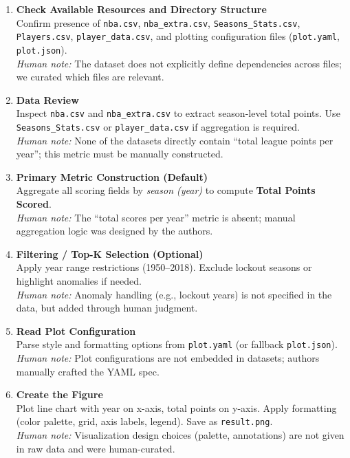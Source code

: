 \documentclass[11pt, a4paper, logo, copyright]{googlecloud}
\begin{document}
\begin{enumerate}[itemsep=0pt, parsep=0pt, topsep=0pt, leftmargin=2em]
    \item \textbf{Check Available Resources and Directory Structure} \\
    Confirm presence of \texttt{nba.csv}, \texttt{nba\_extra.csv}, \texttt{Seasons\_Stats.csv}, \texttt{Players.csv}, \texttt{player\_data.csv}, and plotting configuration files (\texttt{plot.yaml}, \texttt{plot.json}). \\
    \emph{Human note:} The dataset does not explicitly define dependencies across files; we curated which files are relevant.

    \item \textbf{Data Review} \\
    Inspect \texttt{nba.csv} and \texttt{nba\_extra.csv} to extract season-level total points. Use \texttt{Seasons\_Stats.csv} or \texttt{player\_data.csv} if aggregation is required. \\
    \emph{Human note:} None of the datasets directly contain ``total league points per year''; this metric must be manually constructed.

    \item \textbf{Primary Metric Construction (Default)} \\
    Aggregate all scoring fields by \emph{season (year)} to compute \textbf{Total Points Scored}. \\
    \emph{Human note:} The ``total scores per year'' metric is absent; manual aggregation logic was designed by the authors.

    \item \textbf{Filtering / Top-K Selection (Optional)} \\
    Apply year range restrictions (1950--2018). Exclude lockout seasons or highlight anomalies if needed. \\
    \emph{Human note:} Anomaly handling (e.g., lockout years) is not specified in the data, but added through human judgment.

    \item \textbf{Read Plot Configuration} \\
    Parse style and formatting options from \texttt{plot.yaml} (or fallback \texttt{plot.json}). \\
    \emph{Human note:} Plot configurations are not embedded in datasets; authors manually crafted the YAML spec.

    \item \textbf{Create the Figure} \\
    Plot line chart with year on x-axis, total points on y-axis. Apply formatting (color palette, grid, axis labels, legend). Save as \texttt{result.png}. \\
    \emph{Human note:} Visualization design choices (palette, annotations) are not given in raw data and were human-curated.


\end{enumerate}
\end{document}
